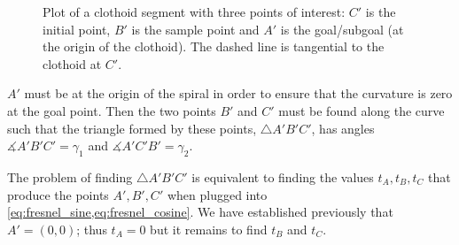 \begin{figure}
    \caption{Plot of a clothoid segment with three points of interest: $C'$ is the initial point, $B'$ is the sample point and $A'$ is the goal/subgoal (at the origin of the clothoid). The dashed line is tangential to the clothoid at $C'$.}
    \label{fig:clothoid_segment}
\end{figure}
$A'$ must be at the origin of the spiral in order to ensure that the curvature is zero at the goal point.
Then the two points $B'$ and $C'$ must be found along the curve such that the triangle formed by these points, $\triangle{A'B'C'}$, has angles $\measuredangle{A'B'C'}=\gamma_1$ and $\measuredangle{A'C'B'}=\gamma_2$.

The problem of finding $\triangle{A'B'C'}$ is equivalent to finding the values $t_A,t_B,t_C$ that produce the points $A',B',C'$ when plugged into \ref{eq:fresnel_sine,eq:fresnel_cosine}. 
We have established previously that $A' = (0, 0)$; thus $t_A=0$ but it remains to find $t_B$ and $t_C$.

